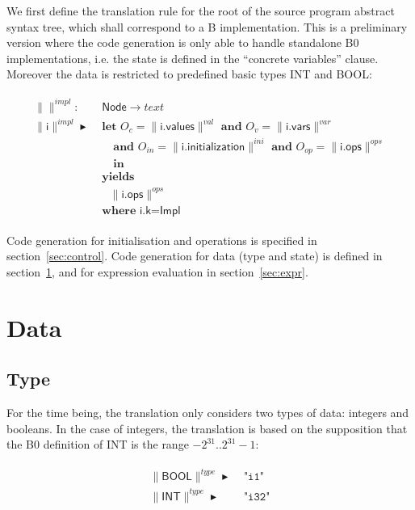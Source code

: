 \documentclass{article}
\newcommand{\trad}[2]{\ensuremath{\lVert \textsf{#1} \rVert^{\textit{#2}}}}
\DeclareMathOperator{\isdef}{\blacktriangleright}
\begin{document}
We first define the translation rule for the root of the source
program abstract syntax tree, which shall correspond to a B
implementation. This is a preliminary version where the code
generation is only able to handle standalone B0 implementations, i.e.
the state is defined in the ``concrete variables'' clause. Moreover
the data is restricted to predefined basic types \textsf{INT} and
\textsf{BOOL}:
\begin{framed}
\begin{align}
\begin{split}
  \trad{}{impl} : & \textsf{ Node} \rightarrow text \\
  \trad{i}{impl} \isdef & \textbf{ let } O_{c} = \trad{i.values}{val} \textbf{ and } O_v = \trad{i.vars}{var} \\
  & \quad \textbf{ and } O_{in} = \trad{i.initialization}{ini} \textbf{ and } O_{op} = \trad{i.ops}{ops} \\
  & \quad \textbf{ in} \\
  & \textbf{ yields } \\
  & \quad \trad{i.ops}{ops}  \\
  & \textbf{ where } \textsf{i.k} = \textsf{Impl} 
\end{split}
\end{align}
\end{framed}
Code generation for initialisation and operations is specified in
section~\ref{sec:control}. Code generation for data (type and
state) is defined in section~\ref{sec:data}, and for expression
evaluation in section~\ref{sec:expr}. 

\section{Data}
\label{sec:data}

\subsection{Type}
\label{sec:type}
For the time being, the translation only considers two types of
data: integers and booleans. In the case of integers, the translation
is based on the supposition that the B0 definition of \textsf{INT}
is the range $-2^{31}.. 2^{31}-1$:

\begin{framed}
\begin{align}
\begin{split}
  \trad{BOOL}{type} \isdef & \texttt{ "i1"} \\
  \trad{INT}{type} \isdef & \texttt{ "i32"}
\end{split}
\end{align}
\end{framed}
\end{document}
